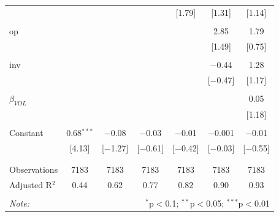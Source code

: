 \documentclass[12pt]{article}
\begin{document}
\begin{table}[!htbp]
\begin{tabular}{@{\extracolsep{5pt}}lcccccc}
  &  &  &  & [1.79] & [1.31] & [1.14] \\ 
  & & & & & & \\ 
 op &  &  &  &  & 2.85 & 1.79 \\ 
  &  &  &  &  & [1.49] & [0.75] \\ 
  & & & & & & \\ 
 inv &  &  &  &  & $-$0.44 & 1.28 \\ 
  &  &  &  &  & [$-$0.47] & [1.17] \\ 
  & & & & & & \\ 
 $\beta_{VOL}$ &  &  &  &  &  & 0.05 \\ 
  &  &  &  &  &  & [1.18] \\ 
  & & & & & & \\ 
 Constant & 0.68$^{***}$ & $-$0.08 & $-$0.03 & $-$0.01 & $-$0.001 & $-$0.01 \\ 
  & [4.13] & [$-$1.27] & [$-$0.61] & [$-$0.42] & [$-$0.03] & [$-$0.55] \\ 
  & & & & & & \\ 
\hline \\[-1.8ex] 
Observations & 7183 & 7183 & 7183 & 7183 & 7183 & 7183 \\ 
Adjusted R$^{2}$ & 0.44 & 0.62 & 0.77 & 0.82 & 0.90 & 0.93 \\ 
\hline 
\hline \\[-1.8ex] 
\textit{Note:}  & \multicolumn{6}{r}{$^{*}$p$<$0.1; $^{**}$p$<$0.05; $^{***}$p$<$0.01} \\ 
\end{tabular} 
\end{table} 



\clearpage
\end{document}
